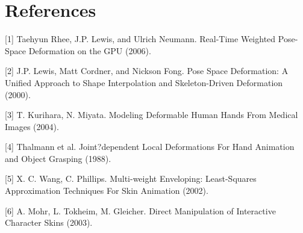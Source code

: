\documentclass[10pt,twocolumn,letterpaper]{article}
\begin{document}
\section*{References}

[1] Taehyun Rhee, J.P. Lewis, and Ulrich Neumann. Real-Time Weighted Pose-Space Deformation on the GPU (2006).

[2] J.P. Lewis, Matt Cordner, and Nickson Fong. Pose Space Deformation: A Unified Approach to Shape Interpolation and Skeleton-Driven Deformation (2000).

[3] T. Kurihara, N. Miyata. Modeling Deformable Human Hands From Medical Images (2004).

[4] Thalmann et al. Joint?dependent Local Deformations For Hand Animation and Object Grasping (1988).

[5] X. C. Wang, C. Phillips. Multi-weight Enveloping: Least-Squares Approximation Techniques For Skin Animation (2002).

[6] A. Mohr, L. Tokheim, M. Gleicher. Direct Manipulation of Interactive Character Skins (2003).
\end{document}
